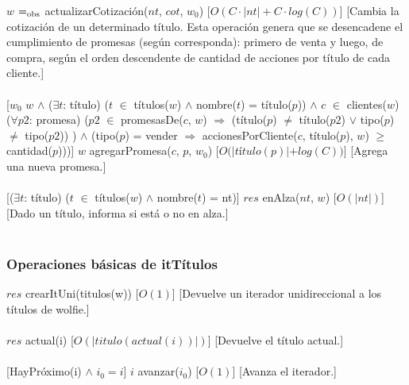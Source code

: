   {$w$ $=_{\mathrm{obs}}$ actualizarCotizaci\'on($nt$, $cot$, $w_{0}$)}%
  [$O(C \cdotp |nt|+C \cdotp log(C))$]
  [Cambia la cotizaci\'on de un determinado t\'itulo. Esta operaci\'on genera que se desencadene el cumplimiento de promesas (seg\'un corresponda): primero de venta y luego, de compra, seg\'un el orden descendente de cantidad de acciones por t\'itulo de cada cliente.]\\\\
  [$w_{0}$ \igobs $w$ $\land$ ($\exists$$t$: t\'itulo) ($t$ $\in$ t\'itulos($w$) $\land$ nombre($t$) = t\'itulo($p$)) $\land$ $c$ $\in$ clientes($w$) \yluego ($\forall$$p2$: promesa) ($p2$ $\in$ promesasDe($c$, $w$) $\Rightarrow$ (t\'itulo($p$) $\neq$ t\'itulo($p2$) $\lor$ tipo($p$) $\neq$ tipo($p2$)) ) $\land$ (tipo($p$) = vender $\Rightarrow$ accionesPorCliente($c$, t\'itulo($p$), $w$) $\geq$ cantidad($p$)))]
  {$w$ \igobs agregarPromesa($c$, $p$, $w_{0}$)}%
  [$O(|t$\'i$tulo(p)| + log(C))$]
  [Agrega una nueva promesa.]\\\\
  [($\exists$$t$: t\'itulo) ($t$ $\in$ t\'itulos($w$) $\land$ nombre($t$) = nt)]
  {$res$ \igobs enAlza($nt$, $w$)}%
  [$O(|nt|)$]
  [Dado un t\'itulo, informa si est\'a o no en alza.]\\\\
  
   \subsubsection{Operaciones b\'asicas de itT\'itulos}
   
  {$res$ \igobs crearItUni(titulos(w))}
  [$O(1)$]
  [Devuelve un iterador unidireccional a los t\'itulos de wolfie.]\\\\
  
  {$res$ \igobs actual(i)}
  [$O(|titulo(actual(i))|)$]
  [Devuelve el t\'itulo actual.]\\\\
  
  [HayPr\'oximo(i) $\land$ $i_{0}=i$]
  {$i$ \igobs avanzar($i_{0}$)}
  [$O(1)$]
  [Avanza el iterador.]\\\\
     
